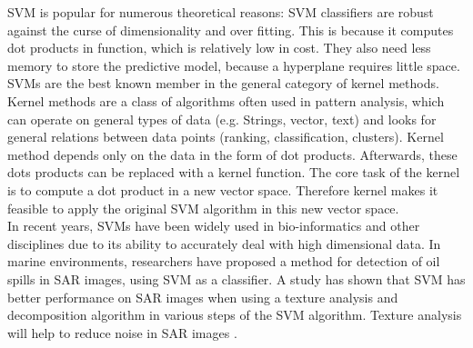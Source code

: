 SVM is popular for numerous theoretical reasons: SVM classifiers are robust against the curse of dimensionality and over fitting. This is because it computes dot products in function, which is relatively low in cost. They also need less memory to store the predictive model, because a hyperplane requires little space. \\

SVMs are the best known member in the general category of kernel methods. Kernel methods are a class of algorithms often used in pattern analysis, which can operate on general types of data (e.g. Strings, vector, text) and looks for general relations between data points (ranking, classification, clusters). Kernel method depends only on the data in the form of dot products. Afterwards, these dots products can be replaced with a kernel function. The core task of the kernel is to compute a dot product in a new vector space. Therefore kernel makes it feasible to apply the original SVM algorithm in this new vector space. \\  







In recent years, SVMs have been widely used in bio-informatics \cite{furey2000support,osuna1997training,guyon2002gene} and other disciplines due to its ability to accurately deal with high dimensional data\cite{joachims1998text}. In marine environments, researchers have proposed a method for detection of oil spills in SAR images, using SVM as a classifier. A study has shown that SVM has better performance on SAR images when using a texture analysis and decomposition algorithm in various steps of the SVM algorithm. Texture analysis will help to reduce noise in SAR images \cite{matkan2013oil}.

